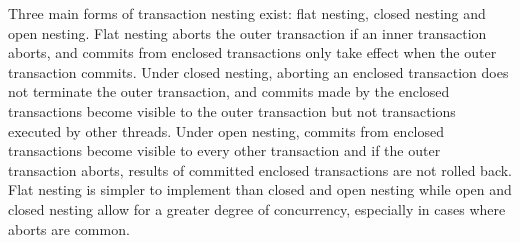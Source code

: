 Three main forms of transaction nesting exist: flat nesting, closed nesting and open nesting\cite[p. 1]{kumar2011hparstm}\cite[p. 42]{harris2010transactional}. Flat nesting aborts the outer transaction if an inner transaction aborts, and commits from enclosed transactions only take effect when the outer transaction commits. Under closed nesting, aborting an enclosed transaction does not terminate the outer transaction, and commits made by the enclosed transactions become visible to the outer transaction but not transactions executed by other threads. Under open nesting, commits from enclosed transactions become visible to every other transaction and if the outer transaction aborts, results of committed enclosed transactions are not rolled back. Flat nesting is simpler to implement than closed and open nesting while open and closed nesting allow for a greater degree of concurrency, especially in cases where aborts are common\cite[p. 43]{harris2010transactional}.

%
%
%
%        
%
%
%	
%
%
%
